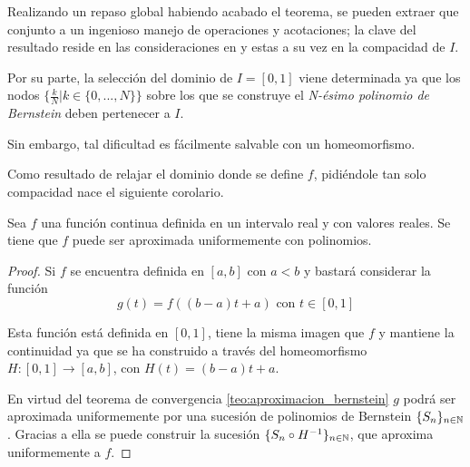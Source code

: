 %

Realizando un repaso global habiendo acabado el teorema, se pueden extraer que conjunto a un ingenioso manejo de operaciones y acotaciones; la clave del resultado reside  en las consideraciones
en   y estas a su vez en la 
compacidad de $I$.

Por su parte, la selección del dominio de $I = [0,1]$ viene determinada ya que 
 los nodos $\{ \frac{k}{N} | k\in \{0,..., N\}\}$ sobre los que se construye el \textit{N-ésimo polinomio de Bernstein}  deben pertenecer a $I$.

Sin embargo, tal dificultad es fácilmente salvable con un homeomorfismo. 


Como resultado de relajar el dominio donde se define $f$, pidiéndole tan solo
compacidad nace el siguiente corolario.  

\begin{corolario} \label{teo:Teorema-Weierstrass}
    Sea $f$ una función continua definida en un intervalo real y con valores reales. Se tiene que $f$ puede ser aproximada uniformemente con polinomios. 
\end{corolario}  

\begin{proof}
    Si $f$ se encuentra definida en $[a,b]$ con $a<b$ y bastará considerar la función
    \begin{equation*}
        g(t) = f( (b-a)t + a) \text{ con } t \in [0,1]
    \end{equation*}

    Esta función está definida en $[0,1]$, tiene la misma imagen que $f$ y 
    mantiene la continuidad ya que se ha construido a través del homeomorfismo 
    $H:[0,1] \longrightarrow [a,b]$, con $H(t) = (b-a)t + a$. 

    En virtud del teorema de convergencia \ref{teo:aproximacion_bernstein}
    $g$ podrá ser aproximada uniformemente por una sucesión de polinomios de Bernstein $\{S_n\}_{n \in \mathbb{N}}$. Gracias a ella se puede
    construir la sucesión $\{S_n \circ H^{-1}\}_{n \in \mathbb{N}}$, que aproxima uniformemente a $f$. 
\end{proof}